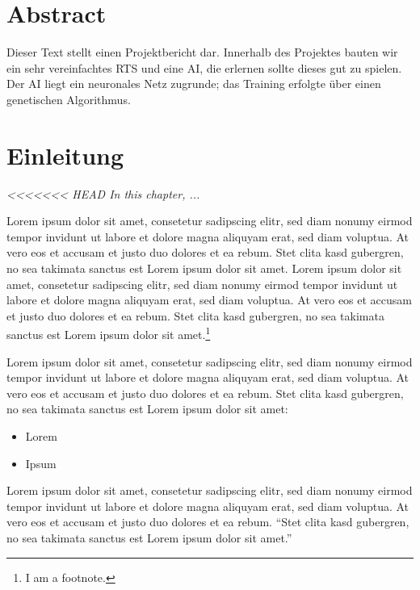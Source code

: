 \documentclass[
	12pt,
	a4paper,
	BCOR10mm,
	DIV14,
	headsepline,
	usegeometry,
]{scrreprt}
\begin{document}
\restoregeometry

\chapter*{Abstract}

\thispagestyle{empty}

Dieser Text stellt einen Projektbericht dar. Innerhalb des Projektes bauten wir ein sehr vereinfachtes RTS und eine AI, die erlernen sollte dieses gut zu spielen. Der AI liegt ein neuronales Netz zugrunde; das Training erfolgte über einen genetischen Algorithmus.

\tableofcontents

\chapter{Einleitung}
\label{Einleitung}

\textit{%
<<<<<<< HEAD
In this chapter, ...
}

\bigskip

Lorem ipsum dolor sit amet, consetetur sadipscing elitr, sed diam nonumy eirmod tempor invidunt ut labore et dolore magna aliquyam erat, sed diam voluptua.
At vero eos et accusam et justo duo dolores et ea rebum.
Stet clita kasd gubergren, no sea takimata sanctus est Lorem ipsum dolor sit amet.
Lorem ipsum dolor sit amet, consetetur sadipscing elitr, sed diam nonumy eirmod tempor invidunt ut labore et dolore magna aliquyam erat, sed diam voluptua.
At vero eos et accusam et justo duo dolores et ea rebum.
Stet clita kasd gubergren, no sea takimata sanctus est Lorem ipsum dolor sit amet.\footnote{I am a footnote.}

Lorem ipsum dolor sit amet, consetetur sadipscing elitr, sed diam nonumy eirmod tempor invidunt ut labore et dolore magna aliquyam erat, sed diam voluptua.
At vero eos et accusam et justo duo dolores et ea rebum.
Stet clita kasd gubergren, no sea takimata sanctus est Lorem ipsum dolor sit amet:

\begin{itemize}
	\item Lorem
	\item Ipsum
\end{itemize}

Lorem ipsum dolor sit amet, consetetur sadipscing elitr, sed diam nonumy eirmod tempor invidunt ut labore et dolore magna aliquyam erat, sed diam voluptua.
At vero eos et accusam et justo duo dolores et ea rebum.
“Stet clita kasd gubergren, no sea takimata sanctus est Lorem ipsum dolor sit amet.”~\cite{Quelle2012}
\end{document}
